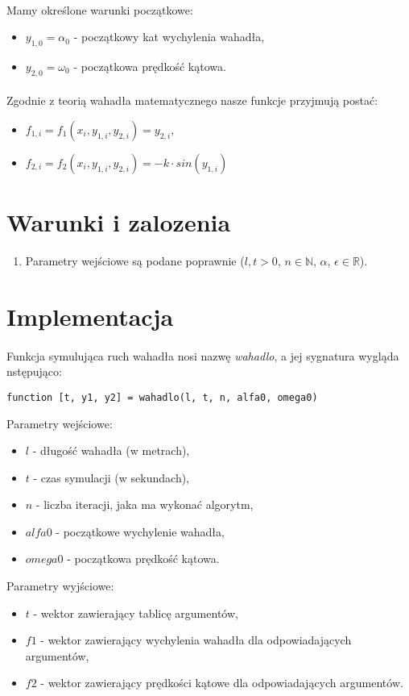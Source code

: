 \documentclass{article}
\begin{document}
\paragraph{}
Mamy określone warunki początkowe:
\begin{itemize}
\item $y_{1,0} = \alpha_0$ - początkowy kat wychylenia wahadła,
\item $y_{2,0} = \omega_0$ - początkowa prędkość kątowa.
\end{itemize}
\paragraph{}
Zgodnie z teorią wahadła matematycznego nasze funkcje przyjmują postać:
\begin{itemize}
\item $f_{1,i} = f_1(x_i,y_{1,i},y_{2,i}) = y_{2,i}$,
\item $f_{2,i} = f_2(x_i,y_{1,i},y_{2,i}) = -k \cdot sin(y_{1,i})$
\end{itemize}
\section{Warunki i zalozenia}
\begin{enumerate}
\item Parametry wejściowe są podane poprawnie ($l, t > 0$, $n \in \mathbb{N}$, $\alpha$, $\epsilon \in \mathbb{R}$).
\end{enumerate}
\section{Implementacja}
\paragraph{}
Funkcja symulująca ruch wahadła nosi nazwę \textit{wahadlo}, a jej sygnatura wygląda nstępująco:
\begin{lstlisting}[style=Matlab-editor]
function [t, y1, y2] = wahadlo(l, t, n, alfa0, omega0)
\end{lstlisting}
\vspace{4pt}
Parametry wejściowe:
\begin{itemize}
\item $l$ - długość wahadła (w metrach),
\item $t$ - czas symulacji (w sekundach),
\item $n$ - liczba iteracji, jaka ma wykonać algorytm,
\item $alfa0$ - początkowe wychylenie wahadła,
\item $omega0$ - początkowa prędkość kątowa.
\end{itemize}
Parametry wyjściowe:
\begin{itemize}
\item $t$ - wektor zawierający tablicę argumentów,
\item $f1$ - wektor zawierający wychylenia wahadła dla odpowiadających argumentów,
\item $f2$ - wektor zawierający prędkości kątowe dla odpowiadających argumentów.
\end{itemize}
\end{document}

